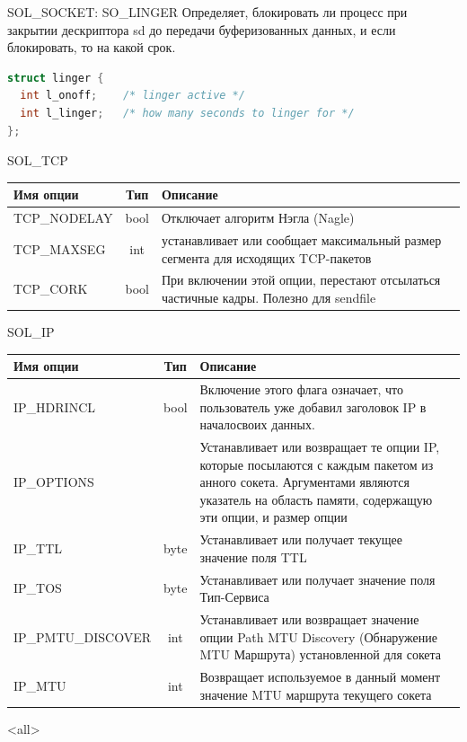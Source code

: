\begin{frame}[fragile]{SOL\_SOCKET: SO\_LINGER}
Определяет,  блокировать ли процесс при закрытии дескриптора sd до передачи буферизованных данных,  и если блокировать,  то на какой срок.
	\begin{lstlisting}[language=C]
struct linger {
  int l_onoff;    /* linger active */
  int l_linger;   /* how many seconds to linger for */
};
	\end{lstlisting}

\end{frame}

\begin{frame}{SOL\_TCP}

\scriptsize
	\begin{table}[ht]
	\centering
	\begin{tabular}[c]{l|c|l}
Имя опции & Тип & Описание \\
	\hline
TCP\_NODELAY & bool & Отключает алгоритм Нэгла (Nagle)\\
TCP\_MAXSEG & int & устанавливает или сообщает максимальный  размер  сегмента  для  исходящих  TCP-пакетов\\
TCP\_CORK & bool & При включении  этой  опции,   перестают  отсылаться  частичные  кадры. Полезно для sendfile
	\end{tabular}
	\end{table}
\normalsize

\end{frame}

\begin{frame}{SOL\_IP}

\scriptsize
	\begin{table}[ht]
	\centering
	\begin{tabular}[c]{l|c|l}
Имя опции & Тип & Описание \\
	\hline
IP\_HDRINCL & bool & Включение этого флага означает,  что пользователь уже  добавил  заголовок  IP  в  началосвоих  данных.\\
IP\_OPTIONS &  & Устанавливает  или  возвращает  те  опции  IP,   которые  посылаются с каждым пакетом из
	анного сокета.  Аргументами являются  указатель  на  область  памяти,   содержащую  эти
	опции,  и размер опции\\
IP\_TTL & byte & Устанавливает  или  получает  текущее значение поля TTL\\
IP\_TOS & byte & Устанавливает  или  получает значение поля Тип-Сервиса \\
IP\_PMTU\_DISCOVER & int & Устанавливает  или  возвращает  значение  опции  Path  MTU  Discovery  
	(Обнаружение MTU Маршрута) установленной для сокета\\
IP\_MTU & int & Возвращает  используемое  в  данный  момент значение MTU маршрута текущего сокета\\
	\end{tabular}
	\end{table}
\normalsize

\end{frame}

\mode<all>{}


